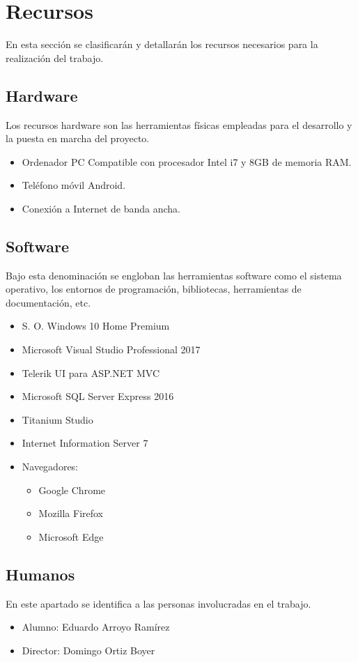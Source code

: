\chapter{Recursos}
En esta sección se clasificarán y detallarán los recursos necesarios para la realización del trabajo.

\section{Hardware}
Los recursos hardware son las herramientas físicas empleadas para el desarrollo y la puesta en marcha del proyecto.
\begin{itemize}
    \item Ordenador PC Compatible con procesador Intel i7 y 8GB de memoria RAM.
    \item Teléfono móvil Android.
    \item Conexión a Internet de banda ancha.
\end{itemize}

\section{Software}
Bajo esta denominación se engloban las herramientas software como el sistema operativo, los entornos de programación, bibliotecas, herramientas de documentación, etc.
\begin{itemize}
    \item S. O. Windows 10 Home Premium
    \item Microsoft Visual Studio Professional 2017
    \item Telerik UI para ASP.NET MVC
    \item Microsoft SQL Server Express 2016
    \item Titanium Studio
    \item Internet Information Server 7
    \item Navegadores:
        \begin{itemize}
            \item Google Chrome
            \item Mozilla Firefox
            \item Microsoft Edge
        \end{itemize}
\end{itemize}

\section{Humanos}
En este apartado se identifica a las personas involucradas en el trabajo.
\begin{itemize}
    \item Alumno: Eduardo Arroyo Ramírez
    \item Director: Domingo Ortiz Boyer
\end{itemize}